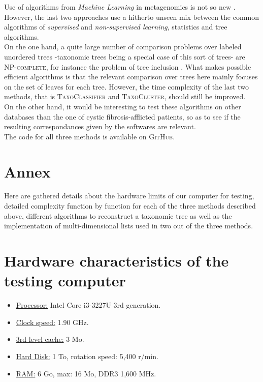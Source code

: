 \documentclass{report}
\begin{document}
Use of algorithms from \emph{Machine Learning} in metagenomics is not so new \cite{Nikolski}. However, the last two approaches use a hitherto unseen mix between the common algorithms of \emph{supervised} and \emph{non-supervised learning}, statistics and tree algorithms.\\

On the one hand, a quite large number of comparison problems over labeled unordered trees -taxonomic trees being a special case of this sort of trees- are \textsc{NP-complete}, for instance the problem of tree inclusion \cite{TreeInclusion}. What makes possible efficient algorithms is that the relevant comparison over trees here mainly focuses on the set of leaves for each tree. However, the time complexity of the last two methods, that is \textsc{TaxoClassifier} and \textsc{TaxoCluster}, should still be improved.\\

On the other hand, it would be interesting to test these algorithms on other databases than the one of cystic fibrosis-afflicted patients, so as to see if the resulting correspondances given by the softwares are relevant.\\

The code for all three methods is available on \textsc{GitHub}.\\

\newpage




\newpage

\appendix

\chapter*{Annex}

Here are gathered details about the hardware limits of our computer for testing, detailed complexity function by function for each of the three methods described above, different algorithms to reconstruct a taxonomic tree as well as the implementation of multi-dimensional lists used in two out of the three methods.

\chapter{Hardware characteristics of the testing computer}

\begin{itemize}
\item \uline{Processor:} Intel Core i3-3227U 3rd generation.
\item \uline{Clock speed:} 1.90 GHz.
\item \uline{3rd level cache:} 3 Mo.
\item \uline{Hard Disk:} 1 To, rotation speed: 5,400 r/min.
\item \uline{RAM:} 6 Go, max: 16 Mo, DDR3 1,600 MHz.
\end{itemize}
\end{document}
